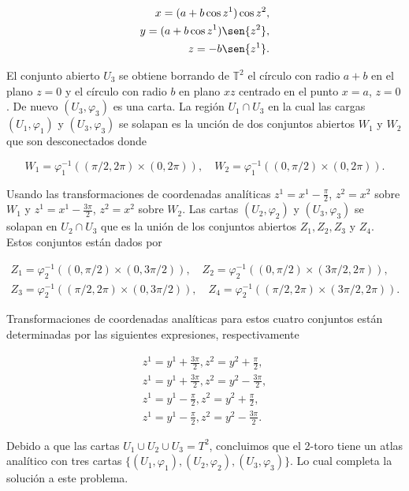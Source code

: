 \documentclass[a4paper,10pt]{article}
\numberwithin{equation}{section}
\begin{document}
\begin{align}
 x = (a+b \cos{z^1})\cos{z^2}, \\
 y = (a+b \cos{z^1})\sen{z^2}, \\
 z = - b \sen{z^1}.
\end{align}

El conjunto abierto $U_3$ se obtiene borrando de $\mathbb{T}^2$ el círculo con 
radio $a+b$ en el plano $z=0$ y el círculo con radio $b$ en plano $xz$ centrado 
en el punto $x=a$, $z=0$. De nuevo $(U_3,\varphi_3)$ es una carta. La región 
$U_1 \cap U_3$ en la cual las cargas $(U_1,\varphi_1)$ y $(U_3,\varphi_3)$ 
se solapan es la unción de dos conjuntos abiertos $W_1$ y $W_2$ que son 
desconectados donde 

\begin{equation}
  W_1 = \varphi_1^{-1}((\pi/2,2\pi) \times (0,2\pi)), \quad 
 W_2 =  \varphi_1^{-1}((0,\pi/2) \times (0,2\pi)).
\end{equation}

Usando las transformaciones de coordenadas analíticas $z^1 = x^1 - \frac{\pi}{2}$, 
$z^2 = x^2$ sobre $W_1$ y $z^1 = x^1 - \frac{3\pi}{2}$, $z^2 = x^2$ sobre $W_2$. 
Las cartas $(U_2,\varphi_2)$ y $(U_3,\varphi_3)$ se solapan en $U_2 \cap U_3$ que 
es la unión de los conjuntos abiertos $Z_1, Z_2, Z_3$ y $Z_4$. Estos conjuntos 
están dados por 

\begin{align}
 Z_1 = \varphi_2^{-1}((0,\pi/2) \times (0,3\pi/2)), \quad 
 Z_2 = \varphi_2^{-1}((0,\pi/2) \times (3\pi/2,2\pi)), \\
 Z_3 = \varphi_2^{-1}((\pi/2,2\pi) \times (0,3\pi/2)), \quad 
 Z_4 = \varphi_2^{-1}((\pi/2,2\pi) \times (3\pi/2,2\pi)).
\end{align}

Transformaciones de coordenadas analíticas para estos cuatro conjuntos están determinadas 
por las siguientes expresiones, respectivamente 

\begin{align}
 z^1 = y^1 + \frac{3\pi}{2}, z^2 = y^2 + \frac{\pi}{2}, \\
 z^1 = y^1 + \frac{3\pi}{2}, z^2 = y^2 - \frac{3\pi}{2}, \\
 z^1 = y^1 - \frac{\pi}{2}, z^2 = y^2 + \frac{\pi}{2}, \\
 z^1 = y^1 - \frac{\pi}{2}, z^2 = y^2 - \frac{3\pi}{2}.
\end{align}

Debido a que las cartas $U_1 \cup U_2 \cup U_3 = T^2$, concluimos que el 2-toro 
tiene un atlas analítico con tres cartas $\{(U_1,\varphi_1),(U_2,\varphi_2),(U_3,\varphi_3)\}$. 
Lo cual completa la solución a este problema.
\end{document}
